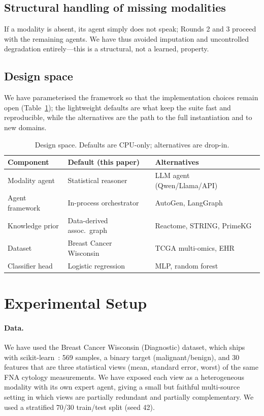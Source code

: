 \documentclass[runningheads]{llncs}
\begin{document}
\subsection{Structural handling of missing modalities}
If a modality is absent, its agent simply does not speak; Rounds 2 and 3 proceed with the remaining agents. We have thus avoided imputation and uncontrolled degradation entirely---this is a structural, not a learned, property.

\subsection{Design space}
We have parameterised the framework so that the implementation choices remain open (Table~\ref{tab:design}); the lightweight defaults are what keep the suite fast and reproducible, while the alternatives are the path to the full instantiation and to new domains.

\begin{table}[t]
\centering
\caption{Design space. Defaults are CPU-only; alternatives are drop-in.}
\label{tab:design}
\begin{tabular}{lll}
\toprule
Component & Default (this paper) & Alternatives \\
\midrule
Modality agent & Statistical reasoner & LLM agent (Qwen/Llama/API)~\cite{qwen2024} \\
Agent framework & In-process orchestrator & AutoGen, LangGraph~\cite{wu2023autogen} \\
Knowledge prior & Data-derived assoc.\ graph & Reactome, STRING, PrimeKG~\cite{gillespie2022reactome,szklarczyk2023string,chandak2023primekg} \\
Dataset & Breast Cancer Wisconsin~\cite{street1993nuclear} & TCGA multi-omics, EHR \\
Classifier head & Logistic regression & MLP, random forest \\
\bottomrule
\end{tabular}
\end{table}

\section{Experimental Setup}
\paragraph{Data.}
We have used the Breast Cancer Wisconsin (Diagnostic) dataset, which ships with scikit-learn~\cite{pedregosa2011scikit,street1993nuclear}: 569 samples, a binary target (malignant/benign), and 30 features that are three statistical views (mean, standard error, worst) of the same FNA cytology measurements. We have exposed each view as a heterogeneous modality with its own expert agent, giving a small but faithful multi-source setting in which views are partially redundant and partially complementary. We used a stratified 70/30 train/test split (seed 42).
\end{document}
